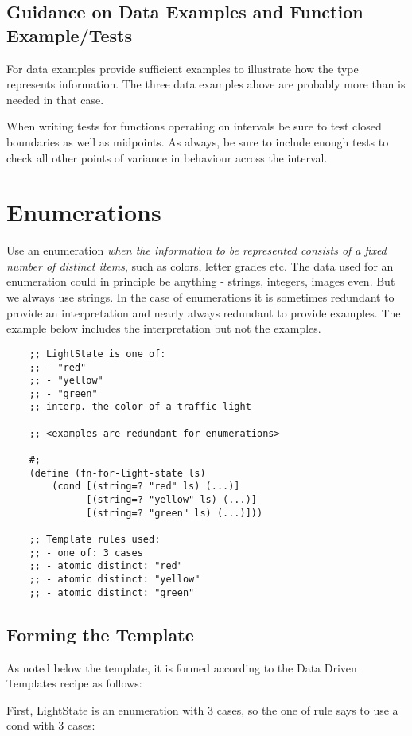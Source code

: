 \documentclass[11pt,a4paper]{report}
\begin{document}
	\subsection*{Guidance on Data Examples and Function Example/Tests}
	For data examples provide sufficient examples to illustrate how the type represents information.
	The three data examples above are probably more than is needed in that case.
	
	When writing tests for functions operating on intervals be sure to test closed boundaries as well
	as midpoints. As always, be sure to include enough tests to check all other points of variance in
	behaviour across the interval.
	\pagebreak
	\section{Enumerations} \label{sec:enumerations}
	Use an enumeration \emph{when the information to be represented consists of a fixed number of
	distinct items}, such as colors, letter grades etc. The data used for an enumeration could in
	principle be anything - strings, integers, images even. But we always use strings. In the case of
	enumerations it is sometimes redundant to provide an interpretation and nearly always redundant
	to provide examples. The example below includes the interpretation but not the examples.
	
	\begin{verbatim}
	;; LightState is one of:
	;; - "red"
	;; - "yellow"
	;; - "green"
	;; interp. the color of a traffic light
	
	;; <examples are redundant for enumerations>
	
	#;
	(define (fn-for-light-state ls)
		(cond [(string=? "red" ls) (...)]
		      [(string=? "yellow" ls) (...)]
		      [(string=? "green" ls) (...)]))
			
	;; Template rules used:
	;; - one of: 3 cases
	;; - atomic distinct: "red"
	;; - atomic distinct: "yellow"
	;; - atomic distinct: "green"
	\end{verbatim}
	
	\subsection*{Forming the Template}
	As noted below the template, it is formed according to the Data Driven Templates recipe as	follows:
	
	First, LightState is an enumeration with 3 cases, so the one of rule says to use a cond with 3	cases:
	
\end{document}

